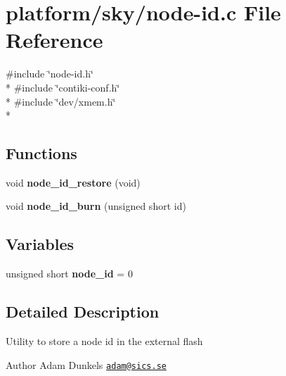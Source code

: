 \hypertarget{node-id_8c}{\section{platform/sky/node-\/id.c File Reference}
\label{node-id_8c}
}
{\ttfamily \#include \char`\"{}node-\/id.\-h\char`\"{}}\\*
{\ttfamily \#include \char`\"{}contiki-\/conf.\-h\char`\"{}}\\*
{\ttfamily \#include \char`\"{}dev/xmem.\-h\char`\"{}}\\*
\subsection*{Functions}
\begin{DoxyCompactItemize}
\item 
\hypertarget{node-id_8c_af27f1d85b89369d779b3797cc7413069}{void {\bfseries node\-\_\-id\-\_\-restore} (void)}\label{node-id_8c_af27f1d85b89369d779b3797cc7413069}

\item 
\hypertarget{node-id_8c_ac9c2451561a06c3fd92ac7a875dea719}{void {\bfseries node\-\_\-id\-\_\-burn} (unsigned short id)}\label{node-id_8c_ac9c2451561a06c3fd92ac7a875dea719}

\end{DoxyCompactItemize}
\subsection*{Variables}
\begin{DoxyCompactItemize}
\item 
\hypertarget{node-id_8c_ac2438f57316879ceb4c59e2be1a42738}{unsigned short {\bfseries node\-\_\-id} = 0}\label{node-id_8c_ac2438f57316879ceb4c59e2be1a42738}

\end{DoxyCompactItemize}


\subsection{Detailed Description}
\begin{DoxyVerb}    Utility to store a node id in the external flash
\end{DoxyVerb}
 \begin{DoxyAuthor}{Author}
Adam Dunkels \href{mailto:adam@sics.se}{\tt adam@sics.\-se} 
\end{DoxyAuthor}
